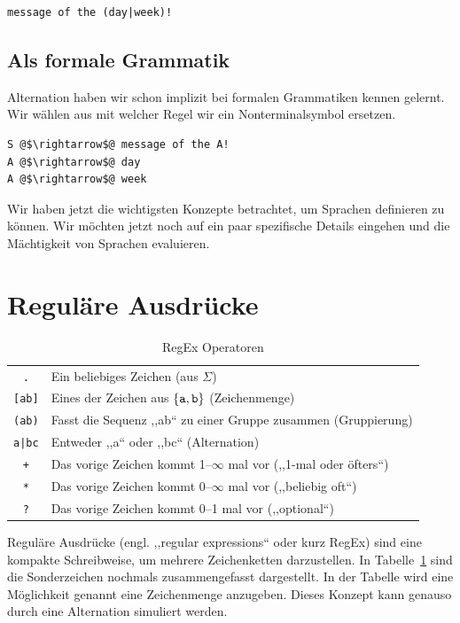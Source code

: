 \begin{lstlisting}
message of the (day|week)!
\end{lstlisting}

\subsection{Als formale Grammatik}
%
Alternation haben wir schon implizit bei formalen Grammatiken kennen gelernt. Wir wählen aus mit welcher Regel wir ein Nonterminalsymbol ersetzen.
%
\begin{lstlisting}
S @$\rightarrow$@ message of the A!
A @$\rightarrow$@ day
A @$\rightarrow$@ week
\end{lstlisting}

Wir haben jetzt die wichtigsten Konzepte betrachtet, um Sprachen definieren zu können. Wir möchten jetzt noch auf ein paar spezifische Details eingehen und die Mächtigkeit von Sprachen evaluieren.

\section{Reguläre Ausdrücke}
%
\begin{table}[ht]
 \begin{center}
  \begin{tabular}{cl}
   \hline
    \texttt{.}     & Ein beliebiges Zeichen (aus $\Sigma$) \\
    \texttt{[ab]}  & Eines der Zeichen aus $\left\{\texttt{a}, \texttt{b}\right\}$ (Zeichenmenge) \\
    \texttt{(ab)}  & Fasst die Sequenz ,,ab`` zu einer Gruppe zusammen (Gruppierung) \\
    \texttt{a|bc}  & Entweder ,,a`` oder ,,bc`` (Alternation) \\
    \texttt{+}     & Das vorige Zeichen kommt 1--$\infty$ mal vor (,,1-mal oder öfters``) \\
    \texttt{*}     & Das vorige Zeichen kommt 0--$\infty$ mal vor (,,beliebig oft``) \\
    \texttt{?}     & Das vorige Zeichen kommt 0--1 mal vor (,,optional``) \\
   \hline
  \end{tabular}
  \caption{RegEx Operatoren}
  \label{tab:regex_op}
 \end{center}
\end{table}
%
Reguläre Ausdrücke (engl. ,,regular expressions`` oder kurz RegEx) sind eine kompakte Schreibweise, um mehrere Zeichenketten darzustellen. In Tabelle~\ref{tab:regex_op} sind die Sonderzeichen nochmals zusammengefasst dargestellt. In der Tabelle wird eine Möglichkeit genannt eine Zeichenmenge anzugeben. Dieses Konzept kann genauso durch eine Alternation simuliert werden.

